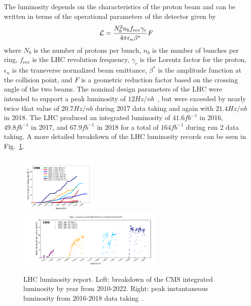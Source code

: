 The luminosity depends on the characteristics of the proton beam and can be written in terms of the operational parameters of the detector given by
\begin{equation}
	\mathcal{L}=\frac{N_b^2n_bf_\mathrm{rev}\gamma_r}{4\pi\epsilon_n\beta^*}F
\end{equation}
where $N_b$ is the number of protons per bunch, $n_b$ is the number of bunches per ring, $f_\mathrm{rev}$ is the LHC revolution frequency, $\gamma_r$ is the Lorentz factor for the proton, $\epsilon_n$ is the transverse normalized beam emittance, $\beta^*$ is the amplitude function at the collision point, and $F$ is a geometric reduction factor based on the crossing angle of the two beams. The nominal design parameters of the LHC were intended to support a peak luminosity of $12\unit{Hz/nb}$~\cite{Bruning:782076}, but were exceeded by nearly twice that value of $20.7\unit{Hz/nb}$ during 2017 data taking and again with $21.4\unit{Hz/nb}$ in 2018. The LHC produced an integrated luminosity of $41.6\unit{fb^{-1}}$ in 2016, $49.8\unit{fb^{-1}}$ in 2017, and $67.9\unit{fb^{-1}}$ in 2018 for a total of $164\unit{fb^{-1}}$ during run 2 data taking. A more detailed breakdown of the LHC luminosity records can be seen in Fig.~\ref{fig:LHC_lumi}.

\begin{figure}[!htbp]
	\centering
	\includegraphics[width=0.34\textwidth]{figs/03_experiment/int_lumi_cumulative_pp_2.pdf}
	\includegraphics[width=0.65\textwidth]{figs/03_experiment/peak_lumi_pp_run2.pdf}
	\caption[LHC luminosity report. Left: breakdown of the CMS integrated luminosity by year from 2010-2022. Right:  peak luminosity from 2016-2018 data taking.]
	{LHC luminosity report. Left: breakdown of the CMS integrated luminosity by year from 2010-2022. Right: peak instantaneous luminosity from 2016-2018 data taking~\cite{CMSlumi}.}
	\label{fig:LHC_lumi}
\end{figure}

